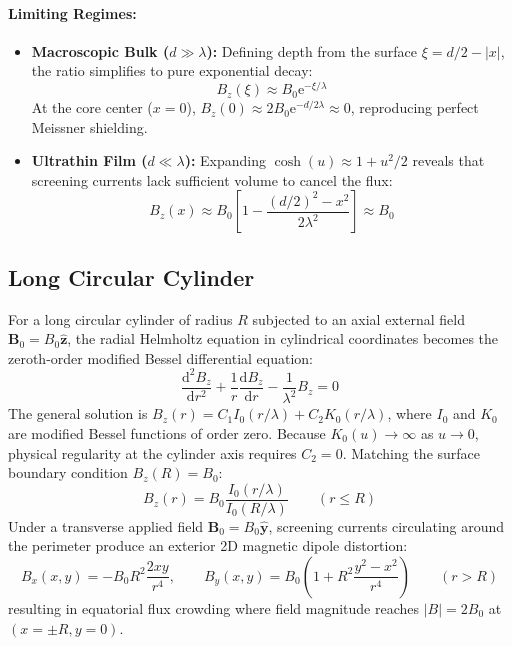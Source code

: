 \documentclass[11pt,a4paper]{article}
\begin{document}
\paragraph{Limiting Regimes:}
\begin{itemize}
    \item \textbf{Macroscopic Bulk ($d \gg \lambda$):} Defining depth from the surface $\xi = d/2 - |x|$, the ratio simplifies to pure exponential decay:
    \begin{equation}
        B_z(\xi) \approx B_0 \mathrm{e}^{-\xi / \lambda}
    \end{equation}
    At the core center ($x = 0$), $B_z(0) \approx 2 B_0 \mathrm{e}^{-d / 2\lambda} \approx 0$, reproducing perfect Meissner shielding.
    \item \textbf{Ultrathin Film ($d \ll \lambda$):} Expanding $\cosh(u) \approx 1 + u^2/2$ reveals that screening currents lack sufficient volume to cancel the flux:
    \begin{equation}
        B_z(x) \approx B_0 \left[ 1 - \frac{(d/2)^2 - x^2}{2\lambda^2} \right] \approx B_0
    \end{equation}
\end{itemize}

\subsection{Long Circular Cylinder}
For a long circular cylinder of radius $R$ subjected to an axial external field $\mathbf{B}_0 = B_0 \hat{\mathbf{z}}$, the radial Helmholtz equation in cylindrical coordinates becomes the zeroth-order modified Bessel differential equation:
\begin{equation}
    \frac{\mathrm{d}^2 B_z}{\mathrm{d}r^2} + \frac{1}{r} \frac{\mathrm{d}B_z}{\mathrm{d}r} - \frac{1}{\lambda^2} B_z = 0
\end{equation}
The general solution is $B_z(r) = C_1 I_0(r/\lambda) + C_2 K_0(r/\lambda)$, where $I_0$ and $K_0$ are modified Bessel functions of order zero. Because $K_0(u) \to \infty$ as $u \to 0$, physical regularity at the cylinder axis requires $C_2 = 0$. Matching the surface boundary condition $B_z(R) = B_0$:
\begin{equation}
    B_z(r) = B_0 \frac{I_0(r / \lambda)}{I_0(R / \lambda)} \qquad (r \le R)
\end{equation}
Under a transverse applied field $\mathbf{B}_0 = B_0 \hat{\mathbf{y}}$, screening currents circulating around the perimeter produce an exterior 2D magnetic dipole distortion:
\begin{equation}
    B_x(x,y) = -B_0 R^2 \frac{2xy}{r^4}, \qquad B_y(x,y) = B_0 \left( 1 + R^2 \frac{y^2 - x^2}{r^4} \right) \qquad (r > R)
\end{equation}
resulting in equatorial flux crowding where field magnitude reaches $|B| = 2 B_0$ at $(x = \pm R, y = 0)$.
\end{document}
